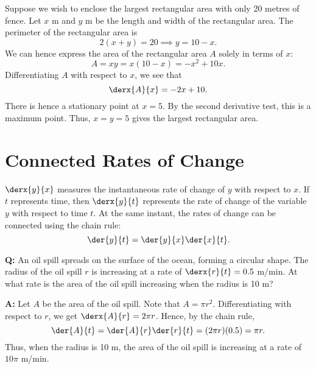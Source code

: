 \begin{example}
    Suppose we wish to enclose the largest rectangular area with only 20 metres of fence. Let $x$ m and $y$ m be the length and width of the rectangular area. The perimeter of the rectangular area is \[2(x + y) = 20 \implies y = 10 - x.\] We can hence express the area of the rectangular area $A$ solely in terms of $x$: \[A = xy = x(10 - x) = -x^2 + 10x.\] Differentiating $A$ with respect to $x$, we see that \[\derx{A}{x} = -2x + 10.\] There is hence a stationary point at $x = 5$. By the second derivative test, this is a maximum point. Thus, $x = y = 5$ gives the largest rectangular area.
\end{example}

\section{Connected Rates of Change}

$\derx{y}{x}$ measures the instantaneous rate of change of $y$ with respect to $x$. If $t$ represents time, then $\derx{y}{t}$ represents the rate of change of the variable $y$ with respect to time $t$. At the same instant, the rates of change can be connected using the chain rule: \[\der{y}{t} = \der{y}{x} \der{x}{t}.\]

\begin{example}
    \phantom{.}

    \textbf{Q:} An oil spill spreads on the surface of the ocean, forming a circular shape. The radius of the oil spill $r$ is increasing at a rate of $\derx{r}{t} = 0.5$ m/min. At what rate is the area of the oil spill increasing when the radius is 10 m?

    \textbf{A:} Let $A$ be the area of the oil spill. Note that $A = \pi r^2$. Differentiating with respect to $r$, we get $\derx{A}{r} = 2\pi r$. Hence, by the chain rule, \[\der{A}{t} = \der{A}{r} \der{r}{t} = (2\pi r) (0.5) = \pi r.\] Thus, when the radius is 10 m, the area of the oil spill is increasing at a rate of $10\pi$ m/min.
\end{example}